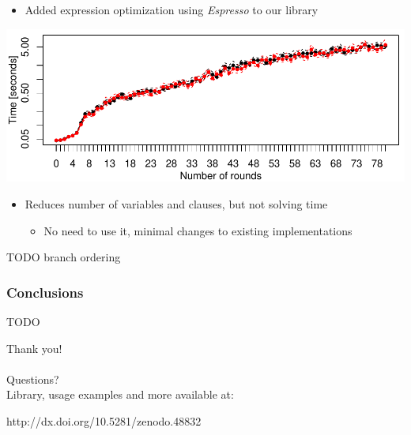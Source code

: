 \documentclass{beamer}
\let\olditem\item
\renewcommand{\item}{%
\olditem\vspace{4pt}}
\begin{document}
\begin{frame}
\begin{itemize}
\item Added expression optimization using \emph{Espresso} to our library
\end{itemize}
\includegraphics[width=\textwidth]{figures/opt-sha1/sha1-32bit-8bitref-cmp-espresso.pdf}
\begin{itemize}
\item Reduces number of variables and clauses, but not solving time
\begin{itemize}
	\item No need to use it, minimal changes to existing implementations
\end{itemize}
\end{itemize}
\end{frame}

\begin{frame}
TODO branch ordering
\end{frame}

\begin{frame}
\frametitle{Conclusions}
TODO
\end{frame}

\begin{frame}
\centering
{\Huge Thank you!}\\
~\\
{\Huge Questions?}\\
\vspace{30pt}
Library, usage examples and more available at:\\
\vspace{20pt}
\begin{minipage}{.3\textwidth}
http://dx.doi.org/10.5281/zenodo.48832
\end{minipage}
\hspace{100pt}
\begin{minipage}{.3\textwidth}
\end{minipage}
\end{frame}
\end{document}
